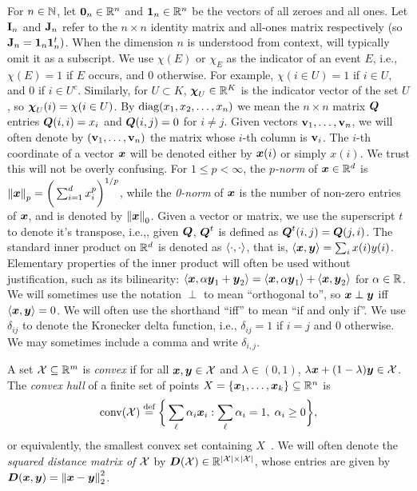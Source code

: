 For $n\in \mathbb{N}$, let $\vb{0}_n\in\mathbb{R}^n$ and $\vb{1}_n\in\mathbb{R}^n$ be the vectors of all zeroes and all ones. Let $\vb{I}_n$ and $\vb{J}_n$  refer to the $n\times n$ identity matrix and all-ones matrix respectively (so $\vb{J}_n=\vb{1}_n\vb{1}_n^t)$. When the dimension $n$ is understood from context, will typically omit it as a subscript. We use $\chi(E)$ or $\chi_E$ as the indicator of an event $E$, i.e., $\chi(E)=1$ if $E$ occurs, and 0 otherwise. For example, $\chi(i\in U)=1$ if $i\in U$, and 0 if $i\in U^c$.  Similarly, for $U\subset K$,  $\boldsymbol{\chi}_U\in\mathbb{R}^K$ is the indicator vector of the set $U$, so $\boldsymbol{\chi}_U(i)=\chi(i\in U)$. 
By $\text{diag}(x_1,x_2,\dots,x_n)$ we mean the $n\times n$ matrix $\vb*{Q}$ entries $\vb*{Q}(i,i)=x_i$ and $\vb*{Q}(i,j)=0$ for $i\neq j$. Given vectors $\vb{v}_1,\dots,\vb{v}_n$, we will often denote by $(\vb{v}_1,\dots,\vb{v}_n)$ the matrix whose $i$-th column is $\vb{v}_i$. The $i$-th coordinate of a vector $\vb*{x}$ will be denoted either by $\vb*{x}(i)$ or simply $x(i)$. We trust this will not be overly confusing.  For $1\leq p<\infty$, the \emph{$p$-norm} of $\vb*{x}\in \mathbb{R}^d$ is 
$\norm{\vb*{x}}_p = \bigg(\sum_{i=1}^d x_i^p\bigg)^{1/p}$,
while the \emph{0-norm} of $\vb*{x}$ is the number of non-zero entries of $\vb*{x}$, and is denoted by $\norm{\vb*{x}}_0$.  Given a vector or matrix, we use the superscript $t$ to denote it's transpose, i.e.,, given $\vb*{Q}$, $\vb*{Q}^t$ is defined as $\vb*{Q}^t(i,j) = \vb*{Q}(j,i)$. The standard inner product on $\mathbb{R}^d$ is denoted as $\langle\cdot,\cdot\rangle$, that is, $\langle \vb*{x},\vb*{y}\rangle = \sum_i x(i)y(i)$. Elementary properties of the inner product will often be used without justification, such as its bilinearity: $\langle \vb*{x},\alpha\vb*{y}_1+\vb*{y}_2\rangle  = \langle \vb*{x},\alpha\vb*{y}_1\rangle + \langle \vb*{x},\vb*{y}_2\rangle$ for $\alpha\in\mathbb{R}$.  We will sometimes use the notation $\perp$ to mean ``orthogonal to'', so $\vb*{x}\perp\vb*{y}$ iff $\langle\vb*{x},\vb*{y}\rangle=0$. We will often use the shorthand ``iff'' to mean ``if and only if''. We use $\delta_{ij}$ to denote the Kronecker delta function, i.e., $\delta_{ij} = 1$ if $i=j$ and 0 otherwise. We may sometimes include a comma and write $\delta_{i,j}$. 

A set $\mathcal{X}\subseteq\mathbb{R}^m$ is \emph{convex} if for all $\vb*{x},\vb*{y}\in\mathcal{X}$ and $\lambda\in(0,1)$, $\lambda\vb*{x} + (1-\lambda)\vb*{y}\in \mathcal{X}$. 
The \emph{convex hull} of a finite set of points $X=\{\vb*{x}_1,\dots,\vb*{x}_k\}\subseteq \mathbb{R}^n$ is 
\begin{equation}
\label{eq:conv(X)}
\textnormal{conv}(\mathcal{X}) \overset{\text{def}}{=} \bigg\{\sum_\ell \alpha_i\vb*{x}_i: \sum_\ell \alpha_i = 1, \;\alpha_i\geq 0\bigg\},
\end{equation}
or equivalently, the smallest convex set containing $X$~\cite{grunbaum1967convex}. We will often denote the \emph{squared distance matrix of $\mathcal{X}$} by $\vb*{D}(\mathcal{X})\in\mathbb{R}^{|\mathcal{X}|\times |\mathcal{X}|}$,  whose entries are given by $\vb*{D}(\vb*{x},\vb*{y}) = \norm{\vb*{x}-\vb*{y}}_2^2$.  


